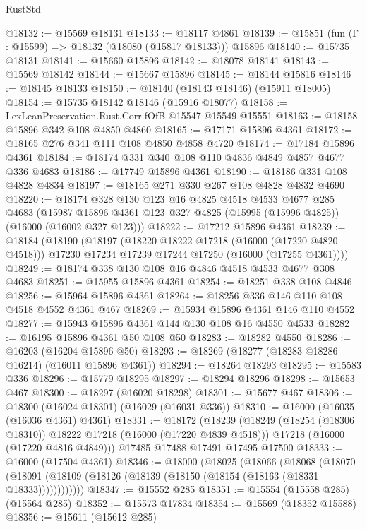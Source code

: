 \begin{lexlean}{RustStd}
\begin{coremodule}
{\begin{coremodule}
{{{{{{{{{{{{{{{{{{{{{{{{{{{{{{{{{{{{{{{{{{{{{{{{{{{{{{{{{{{{@18132 := @15569 @18131
@18133 := @18117 @4861
@18139 := @15851 (fun (Γ : @15599) => @18132 (@18080 (@15817 @18133))) @15896
@18140 := @15735 @18131
@18141 := @15660 @15896
@18142 := @18078 @18141
@18143 := @15569 @18142
@18144 := @15667 @15896
@18145 := @18144 @15816
@18146 := @18145 @18133
@18150 := @18140 (@18143 @18146) (@15911 @18005)
@18154 := @15735 @18142 @18146 (@15916 @18077)
@18158 := LexLeanPreservation.Rust.Corr.fOfB @15547 @15549 @15551
@18163 := @18158 @15896 @342 @108 @4850 @4860
@18165 := @17171 @15896 @4361
@18172 := @18165 @276 @341 @111 @108 @4850 @4858 @4720
@18174 := @17184 @15896 @4361
@18184 := @18174 @331 @340 @108 @110 @4836 @4849 @4857 @4677 @336 @4683
@18186 := @17749 @15896 @4361
@18190 := @18186 @331 @108 @4828 @4834
@18197 := @18165 @271 @330 @267 @108 @4828 @4832 @4690
@18220 := @18174
    @328
    @130
    @123
    @16
    @4825
    @4518
    @4533
    @4677
    @285
    @4683
    (@15987 @15896 @4361 @123 @327 @4825 (@15995 (@15996 @4825)) (@16000 (@16002 @327 @123)))
@18222 := @17212 @15896 @4361
@18239 := @18184
    (@18190
      (@18197
        (@18220 @18222 @17218 (@16000 (@17220 @4820 @4518)))
        @17230
        @17234
        @17239
        @17244
        @17250
        (@16000 (@17255 @4361))))
@18249 := @18174 @338 @130 @108 @16 @4846 @4518 @4533 @4677 @308 @4683
@18251 := @15955 @15896 @4361
@18254 := @18251 @338 @108 @4846
@18256 := @15964 @15896 @4361
@18264 := @18256 @336 @146 @110 @108 @4518 @4552 @4361 @467
@18269 := @15934 @15896 @4361 @146 @110 @4552
@18277 := @15943 @15896 @4361 @144 @130 @108 @16 @4550 @4533
@18282 := @16195 @15896 @4361 @50 @108 @50
@18283 := @18282 @4550
@18286 := @16203 (@16204 @15896 @50)
@18293 := @18269 (@18277 (@18283 @18286 @16214) (@16011 @15896 @4361))
@18294 := @18264 @18293
@18295 := @15583 @336
@18296 := @15779 @18295
@18297 := @18294 @18296
@18298 := @15653 @467
@18300 := @18297 (@16020 @18298)
@18301 := @15677 @467
@18306 := @18300 (@16024 @18301) (@16029 (@16031 @336))
@18310 := @16000 (@16035 (@16036 @4361) @4361)
@18331 := @18172
    (@18239
      (@18249 (@18254 (@18306 @18310)) @18222 @17218 (@16000 (@17220 @4839 @4518)))
      @17218
      (@16000 (@17220 @4816 @4849)))
    @17485
    @17488
    @17491
    @17495
    @17500
@18333 := @16000 (@17504 @4361)
@18346 := @18000
    (@18025
      (@18066
        (@18068
          (@18070 (@18091 (@18109 (@18126 (@18139 (@18150 (@18154 (@18163 (@18331 @18333))))))))))))
@18347 := @15552 @285
@18351 := @15554 (@15558 @285) (@15564 @285)
@18352 := @15573 @17834
@18354 := @15569 (@18352 @15588)
@18356 := @15611 (@15612 @285)
}}}}}}}}}}}}}}}}}}}}}}}}}}}}}}}}}}}}}}}}}}}}}}}}}}}}}}}}}}}}
\end{coremodule}}
\end{coremodule}
\end{lexlean}
